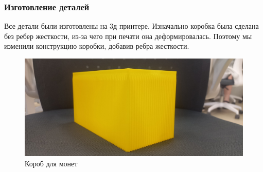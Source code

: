 \subsubsection{Изготовление деталей}

Все детали были изготовлены на 3д принтере. Изначально коробка была сделана без ребер жесткости, из-за чего при печати она деформировалась. 
Поэтому мы изменили конструкцию коробки, добавив ребра жесткости. 

\begin{figure}[H]
	\centering
	\includegraphics[width=12cm]{korob.jpg}
	\caption{Короб для монет}
	\label{ris:korob_done}
\end{figure}
\par\medskip